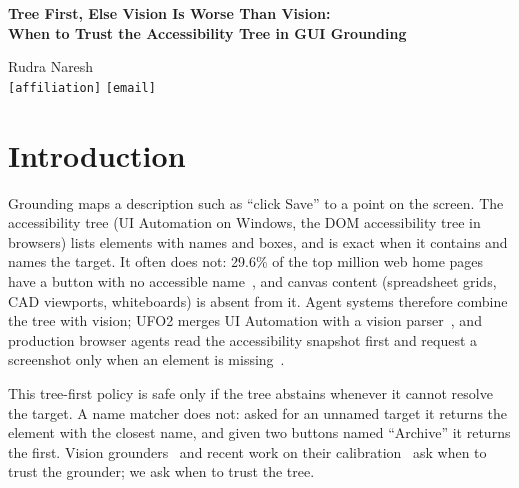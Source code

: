 \documentclass[11pt]{article}
\renewcommand{\maketitle}{\begin{center}
  {\Large\bfseries Tree First, Else Vision Is Worse Than Vision:\\[3pt]
   When to Trust the Accessibility Tree in GUI Grounding\par}\vspace{8pt}
  {\large Rudra Naresh}\\[2pt]
  {\small\texttt{[affiliation]} \quad \texttt{[email]}}
\end{center}\vspace{2pt}}
\begin{document}
\maketitle

\begin{abstract}
Computer-use agents often ground an instruction by asking the accessibility tree first and falling back
to a vision model when the tree has no answer. We measure this policy with ground truth that comes from
neither source. On generated pages covering five ways a tree can fail, and on real Windows screens whose
trees we damage on purpose, the tree-first policy is less accurate than vision alone ($-12.0$ and $-9.5$
points). The loss equals the tree's answer rate times the gap between its precision and vision's accuracy on
the items it answers: the tree keeps answering on ambiguous and canvas-drawn targets, and is then right 54\%
of the time where vision is right 80\%. A gate that trusts an LLM's reading of the tree only when the chosen
element has a name reaches 85.2\% against 66.4\% for vision, and is never below vision on any condition. The
vision side is a 2B grounder trained on 1,572 examples labelled for free by Windows UI Automation on one T4
GPU, which raises accuracy on unseen applications from 1.5\% to 46.5\%.
\end{abstract}

\section{Introduction}

Grounding maps a description such as ``click Save'' to a point on the screen. The accessibility tree (UI
Automation on Windows, the DOM accessibility tree in browsers) lists elements with names and boxes, and is
exact when it contains and names the target. It often does not: 29.6\% of the top million web home pages
have a button with no accessible name~\citep{webaim2025}, and canvas content (spreadsheet grids, CAD
viewports, whiteboards) is absent from it. Agent systems therefore combine the tree with vision; UFO2 merges
UI Automation with a vision parser~\citep{zhang2025ufo2}, and production browser agents read the
accessibility snapshot first and request a screenshot only when an element is missing~\citep{vardanyan2025browser}.

This tree-first policy is safe only if the tree abstains whenever it cannot resolve the target. A name
matcher does not: asked for an unnamed target it returns the element with the closest name, and given two
buttons named ``Archive'' it returns the first. Vision grounders~\citep{cheng2024seeclick,lin2025showui,gou2025uground,wu2025osatlas}
and recent work on their calibration~\citep{wang2026safeground,zhang2025hyperclick} ask when to trust the
grounder; we ask when to trust the tree.
\end{document}
